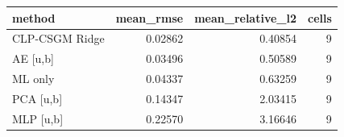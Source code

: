 \begin{tabular}{lrrr}
\toprule
method & mean\_rmse & mean\_relative\_l2 & cells \\
\midrule
CLP-CSGM Ridge & 0.02862 & 0.40854 & 9 \\
AE [u,b] & 0.03496 & 0.50589 & 9 \\
ML only & 0.04337 & 0.63259 & 9 \\
PCA [u,b] & 0.14347 & 2.03415 & 9 \\
MLP [u,b] & 0.22570 & 3.16646 & 9 \\
\bottomrule
\end{tabular}
